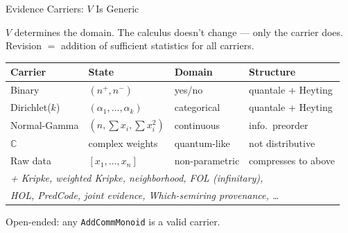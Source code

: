 \documentclass[aspectratio=169,11pt]{beamer}
\begin{document}
\begin{frame}{Evidence Carriers: $V$ Is Generic}

$V$ determines the domain. The calculus doesn't change --- only the carrier does.\\
Revision $=$ addition of sufficient statistics for all carriers.

\begin{center}
{\small
\begin{tabular}{llll}
\toprule
\textbf{Carrier} & \textbf{State} & \textbf{Domain} & \textbf{Structure} \\
\midrule
Binary & $(n^+, n^-)$ & yes/no & quantale + Heyting \\
Dirichlet($k$) & $(\alpha_1, \ldots, \alpha_k)$ & categorical & quantale + Heyting \\
Normal-Gamma & $(n, \sum x_i, \sum x_i^2)$ & continuous & info.\ preorder \\
$\mathbb{C}$ & complex weights & quantum-like & not distributive \\
Raw data & $[x_1, \ldots, x_n]$ & non-parametric & compresses to above \\
\midrule
\multicolumn{4}{l}{\itshape + Kripke, weighted Kripke, neighborhood,
  FOL (infinitary),} \\
\multicolumn{4}{l}{\itshape \quad HOL, PredCode, joint evidence,
  Which-semiring provenance, \ldots} \\
\bottomrule
\end{tabular}}
\end{center}

\smallskip
\alert{Open-ended}: any \texttt{AddCommMonoid} is a valid carrier.

\end{frame}
\end{document}

